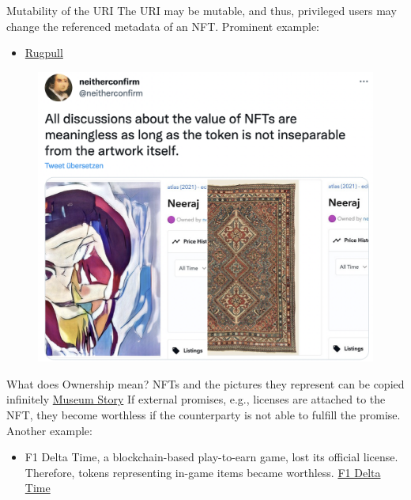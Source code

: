 \documentclass[handout]{beamer}
\begin{document}
\begin{frame}{Mutability of the URI}
		The URI may be mutable, and thus, privileged users may change the referenced metadata of an NFT. Prominent example: 
		\begin{itemize}
			\item \href{https://twitter.com/neitherconfirm/status/1369285946198396928}{\link Rugpull} 
		\end{itemize}
		\begin{figure}
				\centering
				\includegraphics[scale=0.25]{../assets/images/rugpull.png}
				\caption*{}	
			\end{figure}	
\end{frame}

\begin{frame}{What does Ownership mean?}
NFTs and the pictures they represent can be copied infinitely
	\href{https://www.theartnewspaper.com/2022/01/21/a-german-museum-has-accidentally-lost-access-to-two-highly-valuable-nfts}{\link Museum Story}
			If external promises, e.g., licenses are attached to the NFT, they become worthless if the counterparty is not able to fulfill the promise. Another example:
		\begin{itemize}
			\item  F1 Delta Time, a blockchain-based play-to-earn game, lost its official license. Therefore, tokens representing in-game items became worthless. \href{https://www.pcgamer.com/f1-delta-time-one-of-the-first-major-nft-games-has-shut-down/}{\link F1 Delta Time}
		\end{itemize}
\end{frame}
\end{document}
